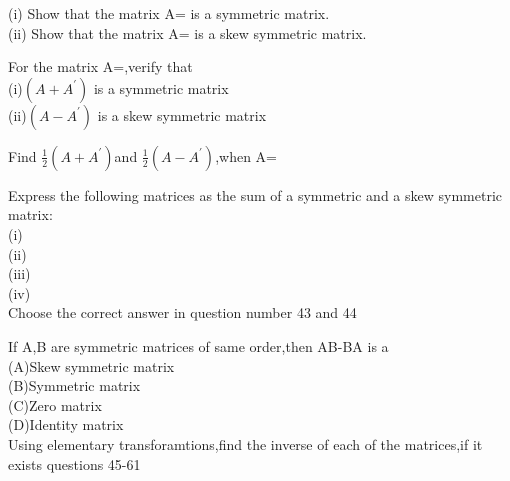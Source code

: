   \item (i) Show that the matrix A= is a symmetric matrix.\\
  (ii) Show that the matrix A= is a skew symmetric matrix.\\
  \item For the matrix A=,verify that\\
  (i)$(A+A^{'})$ is a symmetric matrix\\
  (ii)$(A-A^{'})$ is a skew symmetric matrix\\
  
  \item Find $\frac{1}{2}(A+A^{'}) $and $\frac{1}{2}(A-A^{'})$,when A=\\
  \item Express the following matrices as the sum of a symmetric and a skew symmetric matrix:\\
  (i)  \\(ii)  \\
  (iii) \\ (iv) \\
  
  Choose the correct answer in question number 43 and 44\\
  \item If A,B are symmetric matrices of same order,then AB-BA is a\\
  (A)Skew symmetric matrix \\(B)Symmetric matrix\\
  (C)Zero matrix \\ (D)Identity matrix\\
  
  Using elementary transforamtions,find the inverse of each of the matrices,if it exists questions 45-61\\
  
